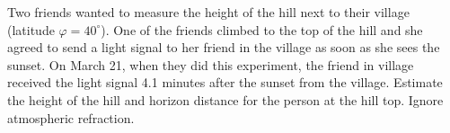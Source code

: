 Two friends wanted to measure the height of the hill next to their village
(latitude $\varphi = 40^\circ$). One of the friends climbed to the top of the
hill and she agreed to send a light signal to her friend in the village as soon
as she sees the sunset. On March 21, when they did this experiment, the friend
in village received the light signal 4.1 minutes after the sunset from the
village. Estimate the height of the hill and horizon distance for the person at
the hill top. Ignore atmospheric refraction.
